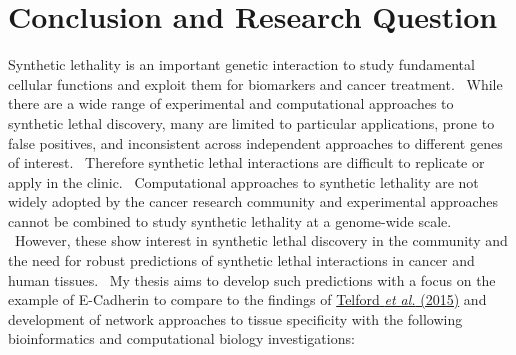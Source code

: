 \clearpage\section{Conclusion and Research Question}

Synthetic lethality is an important genetic interaction to study
fundamental cellular functions and exploit them for biomarkers and
cancer treatment. \ While there are a wide range of experimental and
computational approaches to synthetic lethal discovery, many are
limited to particular applications, prone to false positives, and
inconsistent across independent approaches to different genes of
interest. \ Therefore synthetic lethal interactions are difficult to
replicate or apply in the clinic. \ Computational approaches to
synthetic lethality are not widely adopted by the cancer research
community and experimental approaches cannot be combined to study
synthetic lethality at a genome-wide scale. \ However, these show
interest in synthetic lethal discovery in the community and the need
for robust predictions of synthetic lethal interactions in cancer and
human tissues. \ My thesis aims to develop such predictions with a
focus on the example of E-Cadherin to compare to the findings of
\hyperlink{ENREF94}{Telford}\hyperlink{ENREF94}{\textit{ et
al.}}\hyperlink{ENREF94}{ (2015)} and development of network approaches
to tissue specificity with the following bioinformatics and
computational biology investigations:

